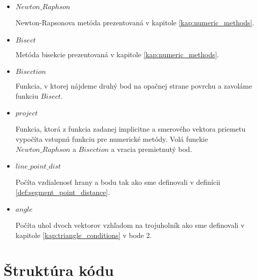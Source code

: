         \begin{itemize}
            \item{
                $Newton\_Raphson$

                Newton-Rapsonova metóda prezentovaná v kapitole \ref{kap:numeric_methods}.
            }
            \item{
                $Bisect$

                Metóda bisekcie prezentovaná v kapitole \ref{kap:numeric_methods}.
            }
            \item{
                $Bisection$

                Funkcia, v ktorej nájdeme druhý bod na opačnej strane povrchu a zavoláme
                funkciu $Bisect$.
            }
            \item{
                $project$

                Funkcia, ktorá z funkcia zadanej implicitne a smerového vektora priemetu
                vypočíta vstupnú funkciu pre numerické metódy. Volá funckie $Newton\_Raphson$
                a $Bisection$ a vracia premietnutý bod.
            }
            \item{
                $line\_point\_dist$

                Počíta vzdialenosť hrany a bodu tak ako sme definovali v definícii 
                \ref{def:segment_point_distance}.
            }
            \item{
                $angle$

                Počíta uhol dvoch vektorov vzhľadom na trojuholník ako sme definovali v kapitole 
                \ref{kap:triangle_conditions} v bode $2$.
            }
        \end{itemize}
\section{Štruktúra kódu}

